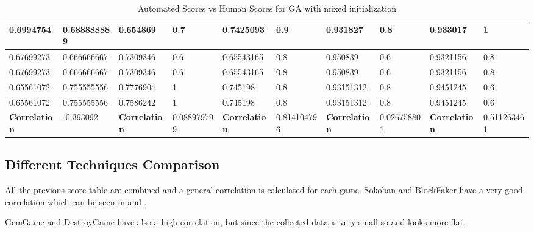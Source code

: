 \begin{landscape}
\begin{table}[!ht]
\begin{tabular}{|p{0.8in}|p{0.8in}|p{0.8in}|p{0.8in}|p{0.8in}|p{0.8in}|p{0.8in}|p{0.8in}|p{0.8in}|p{0.8in}|}
		\hline
		0.6994754 & 0.688888889 & 0.654869 & 0.7 & 0.7425093 & 0.9 & 0.931827 & 0.8 & 0.933017 & 1\\
		\hline
		0.67699273 & 0.666666667 & 0.7309346 & 0.6 & 0.65543165 & 0.8 & 0.950839 & 0.6 & 0.9321156 & 0.8\\
		\hline
		0.67699273 & 0.666666667 & 0.7309346 & 0.6 & 0.65543165 & 0.8 & 0.950839 & 0.6 & 0.9321156 & 0.8\\
		\hline
		0.65561072 & 0.755555556 & 0.7776904 & 1 & 0.745198 & 0.8 & 0.93151312 & 0.8 & 0.9451245 & 0.6\\
		\hline
		0.65561072 & 0.755555556 & 0.7586242 & 1 & 0.745198 & 0.8 & 0.93151312 & 0.8 & 0.9451245 & 0.6\\
		\hline
		\textbf{Correlation} & -0.393092 & \textbf{Correlation} & 0.088979799 & \textbf{Correlation} & 0.814104796 & \textbf{Correlation} & 0.026758801 & \textbf{Correlation} &0.511263461\\
		\hline
	\end{tabular}
	\caption{Automated Scores vs Human Scores for GA with mixed initialization}
	\label{Table:mixedGAScores}
\end{table}
\end{landscape}

\subsection{Different Techniques Comparison}
All the previous score table are combined and a general correlation is calculated for each game. Sokoban and BlockFaker have a very good correlation which can be seen in  and .



GemGame and DestroyGame have also a high correlation, but since the collected data is very small so  and  looks more flat.



